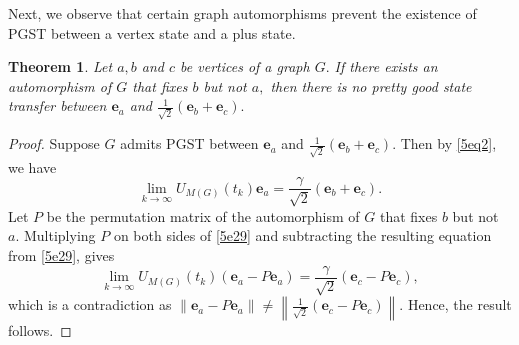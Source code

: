 \documentclass[12pt,a4paper]{article}
\newtheorem{thm}{Theorem}
\def \e {{\bf e}}
\def \e {{\mathbf e}}
\newcommand{\ob}[1]{\left(#1\right)}
\begin{document}
 Next, we observe that certain graph automorphisms prevent the existence of PGST between a vertex state and a plus state.
 \begin{thm}\label{5th1}
 Let $a, b$ and $c$ be vertices of a graph $G.$ If there exists an automorphism of $G$ that fixes $b$ but not $a,$ then there is no pretty good state transfer between 
$\e_a$ and $\frac{1}{\sqrt{2}}\ob{\e_b+\e_c}.$ 
\end{thm} 
\begin{proof}
    Suppose $G$ admits PGST between $\e_a$ and $\frac{1}{\sqrt{2}}\ob{\e_b+\e_c}.$  Then by \eqref{5eq2}, we have
    \begin{equation}\label{5e29}
        \lim_{k \to \infty}U_{M(G)}\ob{t_k}\e_a=\frac{\gamma}{\sqrt{2}}\ob{\e_b+\e_c}.
    \end{equation}
     Let $P$ be the permutation matrix of the automorphism of $G$ that fixes $b$ but not $a.$  Multiplying $P$ on both sides of \eqref{5e29} and subtracting the resulting equation from \eqref{5e29}, gives
 \[
        \lim_{k \to \infty}U_{M(G)}\ob{t_k}(\e_a-P\e_a)=\frac{\gamma}{\sqrt{2}}\ob{\e_c-P\e_c},
    \]
 which is a contradiction as $\left\|\e_a-P\e_a\right\|\neq \left\|\frac{1}{\sqrt{2}}\ob{\e_c-P\e_c}\right\|.$ 
Hence, the result follows.
\end{proof}
\end{document}
